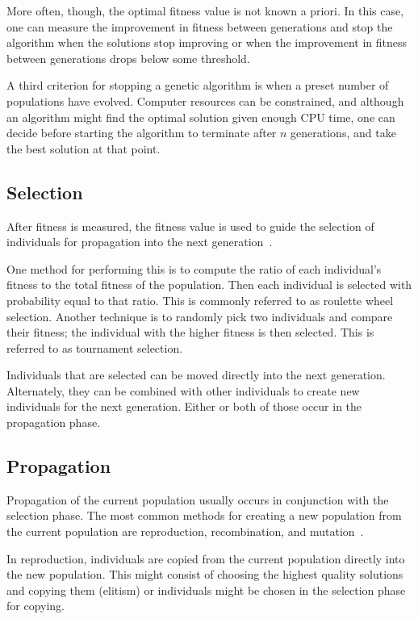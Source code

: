 More often, though, the optimal fitness value is not known a priori. In this
case, one can measure the improvement in fitness between generations and stop
the algorithm when the solutions stop improving or when the improvement in
fitness between generations drops below some threshold.

A third criterion for stopping a genetic algorithm is when a preset number of
populations have evolved. Computer resources can be constrained, and although
an algorithm might find the optimal solution given enough CPU time, one can 
decide before starting the algorithm to terminate after \(n\) generations, and
take the best solution at that point.

\subsection{Selection}

After fitness is measured, the fitness value is used to guide the selection of
individuals for propagation into the next
generation~\cite{haupt2004practical,dejong2006evolutionary}.

One method for performing this is to compute the ratio of each individual's
fitness to the total fitness of the population. Then each individual is selected
with probability equal to that ratio. This is commonly referred to as roulette
wheel selection. Another technique is to randomly pick two individuals and
compare their fitness; the individual with the higher fitness is then selected.
This is referred to as tournament selection.

Individuals that are selected can be moved directly into the next generation.
Alternately, they can be combined with other individuals to create new
individuals for the next generation. Either or both of those occur in the
propagation phase.

\subsection{Propagation}

Propagation of the current population usually occurs in conjunction with the
selection phase. The most common methods for creating a new population from the
current population are reproduction, recombination, and
mutation~\cite{goldberg1989genetic,haupt2004practical,DeJong:1989:UGA:93126.93172}.

In reproduction, individuals are copied from the current population directly
into the new population. This might consist of choosing the highest quality
solutions and copying them (elitism) or individuals might be chosen in the
selection phase for copying.

